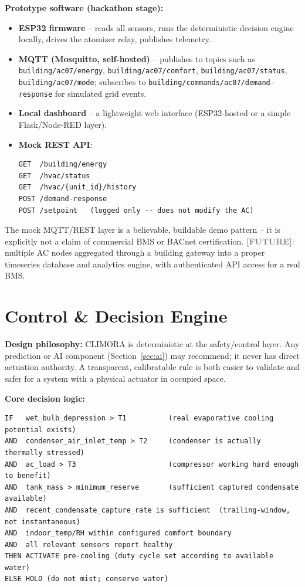 \documentclass[11pt,a4paper]{article}
\newcommand{\future}{\textcolor{gray}{\textbf{[FUTURE]}}}
\begin{document}
\textbf{Prototype software (hackathon stage):}
\begin{itemize}
    \item \textbf{ESP32 firmware} -- reads all sensors, runs the deterministic decision engine locally, drives the atomizer relay, publishes telemetry.
    \item \textbf{MQTT (Mosquitto, self-hosted)} -- publishes to topics such as \texttt{building/ac07/energy}, \texttt{building/ac07/comfort}, \texttt{building/ac07/status}, \texttt{building/ac07/mode}; subscribes to \texttt{building/commands/ac07/demand-response} for simulated grid events.
    \item \textbf{Local dashboard} -- a lightweight web interface (ESP32-hosted or a simple Flask/Node-RED layer).
    \item \textbf{Mock REST API}:
    \begin{verbatim}
GET  /building/energy
GET  /hvac/status
GET  /hvac/{unit_id}/history
POST /demand-response
POST /setpoint   (logged only -- does not modify the AC)
    \end{verbatim}
\end{itemize}

\begin{simbox}
The mock MQTT/REST layer is a believable, buildable demo pattern -- it is explicitly not a claim of commercial BMS or BACnet certification. \future: multiple AC nodes aggregated through a building gateway into a proper timeseries database and analytics engine, with authenticated API access for a real BMS.
\end{simbox}

\section{Control \& Decision Engine}
\label{sec:control}

\textbf{Design philosophy:} CLIMORA is deterministic at the safety/control layer. Any prediction or AI component (Section~\ref{sec:ai}) may recommend; it never has direct actuation authority. A transparent, calibratable rule is both easier to validate and safer for a system with a physical actuator in occupied space.

\textbf{Core decision logic:}
\begin{verbatim}
IF   wet_bulb_depression > T1          (real evaporative cooling potential exists)
AND  condenser_air_inlet_temp > T2     (condenser is actually thermally stressed)
AND  ac_load > T3                      (compressor working hard enough to benefit)
AND  tank_mass > minimum_reserve       (sufficient captured condensate available)
AND  recent_condensate_capture_rate is sufficient  (trailing-window, not instantaneous)
AND  indoor_temp/RH within configured comfort boundary
AND  all relevant sensors report healthy
THEN ACTIVATE pre-cooling (duty cycle set according to available water)
ELSE HOLD (do not mist; conserve water)
\end{verbatim}
\end{document}
